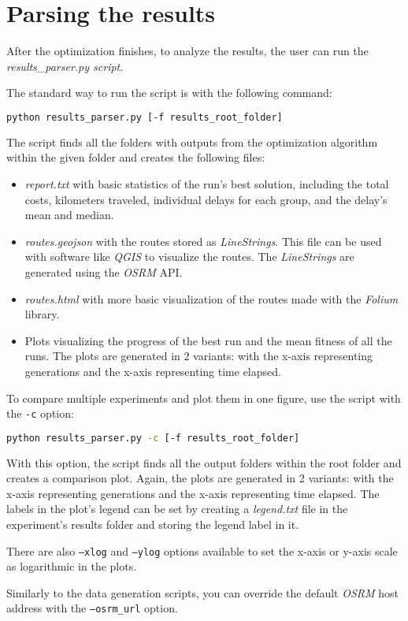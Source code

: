 \section{Parsing the results}

After the optimization finishes, to analyze the results, the user can run the \textit{results\_parser.py script}.

The standard way to run the script is with the following command:

\begin{lstlisting}[language=bash]
    python results_parser.py [-f results_root_folder] 
\end{lstlisting}

The script finds all the folders with outputs from the optimization algorithm within the given folder and creates the following files:

\begin{itemize}
    \setlength\itemsep{0pt}
    \item \textit{report.txt} with basic statistics of the run's best solution, including the total costs, kilometers traveled, individual delays for each group, and the delay's mean and median.
    \item \textit{routes.geojson} with the routes stored as \textit{LineStrings}. This file can be used with software like \textit{QGIS} to visualize the routes. The \textit{LineStrings} are generated using the \textit{OSRM} API.
    \item \textit{routes.html} with more basic visualization of the routes made with the \textit{Folium} library.
    \item Plots visualizing the progress of the best run and the mean fitness of all the runs. The plots are generated in 2 variants: with the x-axis representing generations and the x-axis representing time elapsed.
\end{itemize}

To compare multiple experiments and plot them in one figure, use the script with the \texttt{-c} option:

\begin{lstlisting}[language=bash]
    python results_parser.py -c [-f results_root_folder] 
\end{lstlisting}

With this option, the script finds all the output folders within the root folder and creates a comparison plot. Again, the plots are generated in 2 variants: with the x-axis representing generations and the x-axis representing time elapsed. The labels in the plot's legend can be set by creating a \textit{legend.txt} file in the experiment's results folder and storing the legend label in it.

There are also \texttt{--xlog} and \texttt{--ylog} options available to set the x-axis or y-axis scale as logarithmic in the plots.

Similarly to the data generation scripts, you can override the default \textit{OSRM} host address with the \texttt{--osrm\_url} option.



